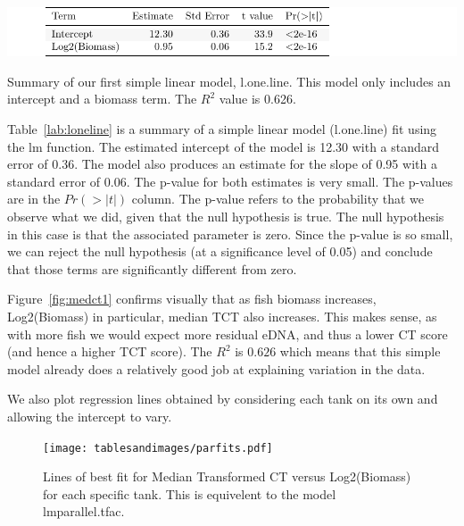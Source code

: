 %


\begin{table}[H]
\includegraphics{Chapter3Images/lonelinekable.pdf}
\caption{Summary of our first simple linear model,  l.one.line. This model only includes an intercept and a biomass term. The $R^{2}$ value is 0.626.}
\label{lab:loneline}
\end{table}


Table~\ref{lab:loneline} is a summary of a simple linear model (l.one.line)  fit using the lm function. The estimated intercept of the model is 12.30 with a standard error of 0.36. The model also produces an estimate for the slope of 0.95 with a standard error of 0.06.  The p-value for both estimates is very small. The p-values are in the $Pr(>|t|)$ column. The p-value refers to the probability that we observe what we did, given that the null hypothesis is true. The null hypothesis in this case is that the associated parameter is zero. Since the p-value is so small, we can reject the null hypothesis (at a significance level of 0.05) and conclude that those terms are significantly different from zero. 

\vspace{12pt}


Figure~\ref{fig:medct1} confirms visually that as fish biomass increases, Log2(Biomass) in particular, median TCT also increases. This makes sense, as with more fish we would expect more residual eDNA, and thus a lower CT score (and hence a higher TCT score). The $R^{2}$ is $0.626$ which means that this simple model already does a relatively good job at explaining variation in the data.

\newpage

We also plot regression lines obtained by considering each tank on its own and allowing the intercept to vary. 


\begin{figure}[H]
\texttt{[image: tablesandimages/parfits.pdf]}
\caption{ Lines of best fit for Median Transformed CT versus Log2(Biomass) for each specific tank. This is equivelent to the model  lmparallel.tfac.}
\label{fig:medpar}
\end{figure}

